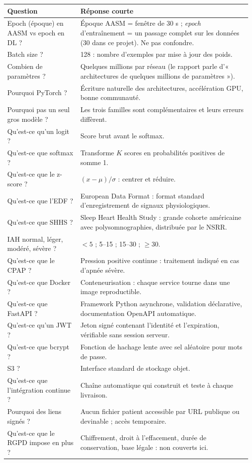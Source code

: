 \documentclass[11pt,a4paper]{report}
\begin{document}
\begin{longtable}{@{}p{6.4cm}p{9.0cm}@{}}
\toprule
\textbf{Question} & \textbf{Réponse courte} \\
\midrule
\endhead
Epoch (époque) en AASM vs epoch en DL ? & Époque AASM = fenêtre de 30 s ; \emph{epoch} d'entraînement = un passage complet sur les données (30 dans ce projet). Ne pas confondre. \\
Batch size ? & 128 : nombre d'exemples par mise à jour des poids. \\
Combien de paramètres ? & Quelques millions par réseau (le rapport parle d'« architectures de quelques millions de paramètres »). \\
Pourquoi PyTorch ? & Écriture naturelle des architectures, accélération GPU, bonne communauté. \\
Pourquoi pas un seul gros modèle ? & Les trois familles sont complémentaires et leurs erreurs diffèrent. \\
Qu'est-ce qu'un logit ? & Score brut avant le softmax. \\
Qu'est-ce que softmax ? & Transforme $K$ scores en probabilités positives de somme 1. \\
Qu'est-ce que le z-score ? & $(x-\mu)/\sigma$ : centrer et réduire. \\
Qu'est-ce que l'EDF ? & European Data Format : format standard d'enregistrement de signaux physiologiques. \\
Qu'est-ce que SHHS ? & Sleep Heart Health Study : grande cohorte américaine avec polysomnographies, distribuée par le NSRR. \\
IAH normal, léger, modéré, sévère ? & $<5$ ; 5--15 ; 15--30 ; $\ge30$. \\
Qu'est-ce que le CPAP ? & Pression positive continue : traitement indiqué en cas d'apnée sévère. \\
Qu'est-ce que Docker ? & Conteneurisation : chaque service tourne dans une image reproductible. \\
Qu'est-ce que FastAPI ? & Framework Python asynchrone, validation déclarative, documentation OpenAPI automatique. \\
Qu'est-ce qu'un JWT ? & Jeton signé contenant l'identité et l'expiration, vérifiable sans session serveur. \\
Qu'est-ce que bcrypt ? & Fonction de hachage lente avec sel aléatoire pour mots de passe. \\
S3 ? & Interface standard de stockage objet. \\
Qu'est-ce que l'intégration continue ? & Chaîne automatique qui construit et teste à chaque livraison. \\
Pourquoi des liens signés ? & Aucun fichier patient accessible par URL publique ou devinable ; accès temporaire. \\
Qu'est-ce que le RGPD impose en plus ? & Chiffrement, droit à l'effacement, durée de conservation, base légale : non couverts ici. \\
\bottomrule
\end{longtable}
\end{document}
